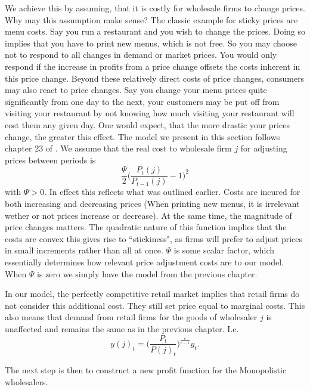 \documentclass[11pt,a4paper,oneside]{book}
\begin{document}
We achieve this by assuming, that it is costly for wholesale firms to change prices. Why may this assumption make sense? The classic example for sticky prices are menu costs. Say you run a restaurant and you wish to change the prices. Doing so implies that you have to print new menus, which is not free. So you may choose not to respond to all changes in demand or market prices. You would only respond if the increase in profits from a price change offsets the costs inherent in this price change. Beyond these relatively direct costs of price changes, consumers may also react to price changes. Say you change your menu prices quite significantly from one day to the next, your customers may be put off from visiting your restaurant by not knowing how much visiting your restaurant will cost them any given day. One would expect, that the more drastic your prices change, the greater this effect. The model we present in this section follows chapter 23 of \cite{chugh_2015}.
We assume that the real cost to wholesale firm $j$ for adjusting prices between periods is
\begin{equation}
	\frac{\Psi}{2}\bigg(\frac{P_t(j)}{P_{t-1}(j)}-1\bigg)^2
\end{equation}
with $ \Psi > 0 $. In effect this reflects what was outlined earlier. Costs are incured for both increasing and decreasing prices (When printing new menus, it is irrelevant wether or not prices increase or decrease). At the same time, the magnitude of price changes matters. The quadratic nature of this function implies that the costs are convex this gives rise to ``stickiness", as firms will prefer to adjust prices in small increments rather than all at once. $\Psi$ is some scalar factor, which essentially determines how relevant price adjustment costs are to our model. When $\Psi$ is zero we simply have the model from the previous chapter.

In our model, the perfectly competitive retail market implies that retail firms do not consider this additional cost. They still set price equal to marginal costs. This also means that demand from retail firms for the goods of wholesaler $j$ is unaffected and remains the same as in the previous chapter. I.e.
\begin{equation*}
	y(j)_t = \bigg(\frac{P_t}{P(j)_t}\bigg)^{\frac{\epsilon}{\epsilon-1}}y_t.
\end{equation*}

The next step is then to construct a new profit function for the Monopolistic wholesalers.
\end{document}
